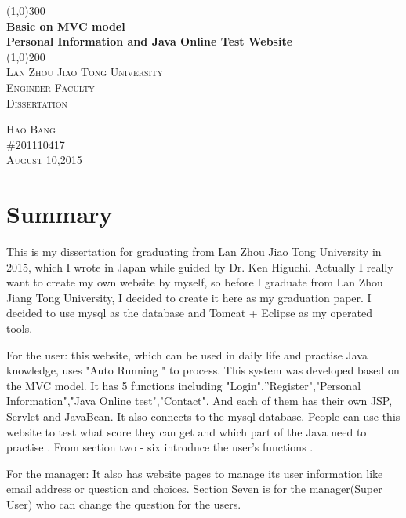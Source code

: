\documentclass[12pt]{article}
\begin{document}
\begin{titlepage}
	\begin{center}
	\line(1,0){300}\\
	[0.25in]
	\huge{\bfseries Basic on MVC model \\ Personal Information and Java Online Test Website}\\
	[2mm]
	\line(1,0){200}\\
	[1.5cm]
	\textsc{\LARGE Lan Zhou Jiao Tong University}\\
	[0.75cm]
	\textsc{\LARGE Engineer Faculty}\\
	[0.75cm]
	\textsc{\LARGE Dissertation}\\
	[3cm]	
	\end{center}
	\begin{flushright}
	\textsc{\normalsize Hao Bang\\
	\#201110417\\
		August 10,2015\\}
	\end{flushright}
	
	
	
	
	
\end{titlepage}

\section * {Summary}
   This is my dissertation for graduating from Lan Zhou Jiao Tong University in 2015, which I wrote in Japan while guided by Dr. Ken Higuchi. Actually I really want to create my own website by myself, so before I graduate from Lan Zhou Jiang Tong University, I decided to create it here as my graduation paper. I decided to use mysql as the database and Tomcat + Eclipse as my operated tools.
   
   For the user: this website, which can be used in daily life and practise Java knowledge, uses "Auto Running " to process. This system was developed based on the MVC model. It has 5 functions including "Login",''Register","Personal Information","Java Online test","Contact". And each of them has their own JSP, Servlet and JavaBean.  It also connects to the mysql database.  People can use this website to test what score they can get and which part of the Java need to practise . From section two - six introduce the user's functions .  
   
   For the manager: It also has website pages to manage its user information like email address or question and choices. Section Seven is for the manager(Super User) who can change the question for the users.
   
\end{document}
